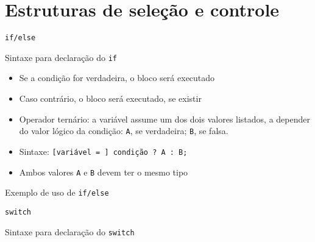 \section{Estruturas de seleção e controle}

\begin{frame}[fragile]{\texttt{if/else}}

    \begin{block}{Sintaxe para declaração do \texttt{if}}
    \end{block}
	\begin{itemize}
	    \item Se a condição for verdadeira, o bloco  será executado

        \item Caso contrário, o bloco  será executado, se existir

		\item Operador ternário: a variável assume um dos dois valores listados, a depender 
        do valor lógico da condição: \texttt{A}, se verdadeira; \texttt{B}, se falsa.

        \item Sintaxe: \texttt{[variável = ] condição ? A : B;}

        \item Ambos valores \texttt{A} e \texttt{B} devem ter o mesmo tipo
	\end{itemize}

\end{frame}

\begin{frame}[fragile]{Exemplo de uso de \texttt{if/else}}
\end{frame}

\begin{frame}[fragile]{\texttt{switch}}

    \begin{block}{Sintaxe para declaração do \texttt{switch}}
    \end{block}

\end{frame}


